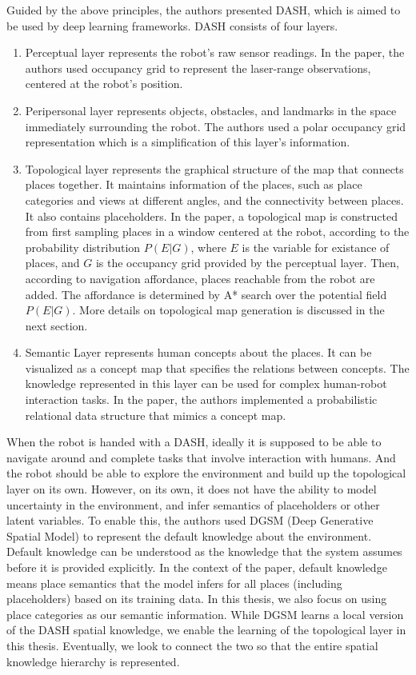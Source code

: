 \documentclass[11pt, titlepage]{article}
\theoremstyle{definition}
\begin{document}
\noindent Guided by the above principles, the authors presented DASH, which is aimed to be used by deep learning frameworks. DASH consists of four layers.
\begin{enumerate}[label=(\arabic*)]
    \item Perceptual layer represents the robot's raw sensor readings. In the paper, the authors used occupancy grid to represent the laser-range observations, centered at the robot's position.
    \item Peripersonal layer represents objects, obstacles, and landmarks in the space immediately surrounding the robot. The authors used a polar occupancy grid representation which is a simplification of this layer's information. 
    \item Topological layer represents the graphical structure of the map that connects places together. It maintains information of the places, such as place categories and views at different angles, and the connectivity between places. It also contains placeholders. In the paper, a topological map is constructed from first sampling places in a window centered at the robot, according to the probability distribution $P(E|G)$, where $E$ is the variable for existance of places, and $G$ is the occupancy grid provided by the perceptual layer. Then, according to navigation affordance, places reachable from the robot are added. The affordance is determined by A* search over the potential field $P(E|G)$.  More details on topological map generation is discussed in the next section.
    \item Semantic Layer represents human concepts about the places. It can be visualized as a concept map that specifies the relations between concepts. The knowledge represented in this layer can be used for complex human-robot interaction tasks. In the paper, the authors implemented a probabilistic relational data structure that mimics a concept map.
\end{enumerate}
When the robot is handed with a DASH, ideally it is supposed to be able to navigate around and complete tasks that involve interaction with humans. And the robot should be able to explore the environment and build up the topological layer on its own. However, on its own, it does not have the ability to model uncertainty in the environment, and infer semantics of placeholders or other latent variables. To enable this, the authors used DGSM (Deep Generative Spatial Model) \cite{pronobis2016learning} to represent the default knowledge about the environment. Default knowledge can be understood as the knowledge that the system assumes before it is provided explicitly. In the context of the paper, default knowledge means place semantics that the model infers for all places (including placeholders) based on its training data. In this thesis, we also focus on using place categories as our semantic information. While DGSM learns a local version of the DASH spatial knowledge, we enable the learning of the topological layer in this thesis. Eventually, we look to connect the two so that the entire spatial knowledge hierarchy is represented.
\end{document}
